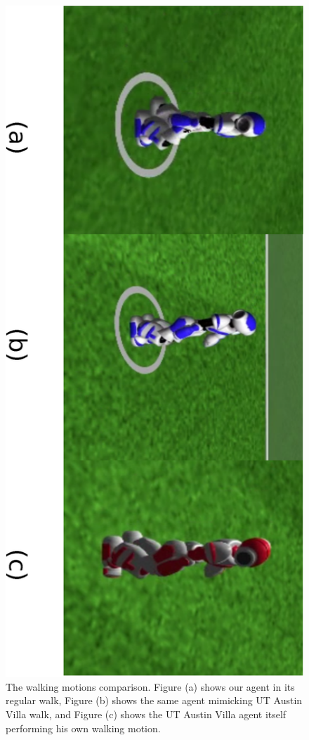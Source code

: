 \begin{figure}[!htbp]
	\centering
	\includegraphics[angle=90, width=1\textwidth]{Cap6/walkings}
	\caption{The walking motions comparison. Figure (a) shows our agent in its regular walk, Figure (b) shows the same agent mimicking UT Austin Villa walk, and Figure (c) shows the UT Austin Villa agent itself performing his own walking motion.}
	\label{fig:walkings}
\end{figure}

